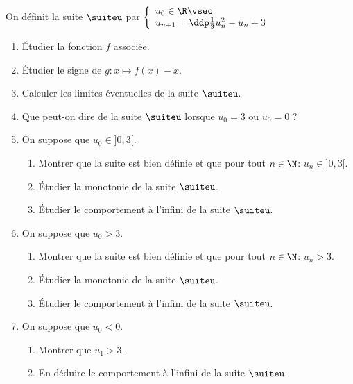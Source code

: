 
\begin{exercice} \;
On d\'efinit la suite $\suiteu$ par 
$\left\lbrace\begin{array}{l}
u_0\in\R\vsec\\
u_{n+1}=\ddp\frac{1}{3}u_n^2-u_n+3
\end{array}\right.$
\begin{enumerate}
\item \'Etudier la fonction $f$ associ\'ee.
\item \'Etudier le signe de $g: x\mapsto f(x)-x$.
\item Calculer les limites \'eventuelles de la suite $\suiteu$.
\item Que peut-on dire de la suite $\suiteu$ lorsque $u_0=3$ ou $u_0=0$ ?
\item On suppose que $u_0\in\rbrack 0,3\lbrack$.
\begin{enumerate}
\item Montrer que la suite est bien d\'efinie et que pour tout $n\in\N$: $u_n\in\rbrack 0,3\lbrack$.
\item \'Etudier la monotonie de la suite $\suiteu$.
\item \'Etudier le comportement \`{a} l'infini de la suite $\suiteu$.
\end{enumerate}
\item On suppose que $u_0>3$.
\begin{enumerate}
\item Montrer que la suite est bien d\'efinie et que pour tout $n\in\N$: $u_n>3$.
\item \'Etudier la monotonie de la suite $\suiteu$.
\item \'Etudier le comportement \`{a} l'infini de la suite $\suiteu$.
\end{enumerate} 
\item On suppose que $u_0<0$.
\begin{enumerate}
\item Montrer que $u_1>3$.
\item En d\'eduire le comportement \`{a} l'infini de la suite $\suiteu$.
\end{enumerate} 
\end{enumerate}
\end{exercice}